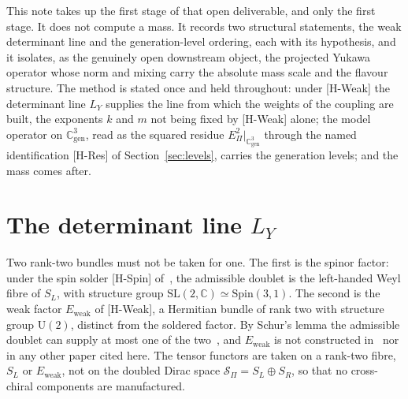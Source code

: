 \documentclass[11pt]{article}
\theoremstyle{definition}
\theoremstyle{remark}
\newcommand{\Cgen}{\mathbb{C}^{3}_{\mathrm{gen}}}
\newcommand{\Epi}{E_{\Pi}}
\newcommand{\Sbundle}{\mathcal{S}_{\Pi}}
\newcommand{\SW}{S_{L}}
\newcommand{\Ew}{E_{\mathrm{weak}}}
\newcommand{\LY}{L_{Y}}
\newcommand{\UU}{\mathrm{U}}
\newcommand{\SL}{\mathrm{SL}}
\newcommand{\Spin}{\mathrm{Spin}}
\begin{document}
    This note takes up the first stage of that open deliverable, and only the first stage.
    It does not compute a mass.
    It records two structural statements, the weak determinant line and the generation-level ordering, each with its
    hypothesis, and it isolates, as the genuinely open downstream object, the projected Yukawa operator whose norm and
    mixing carry the absolute mass scale and the flavour structure.
    The method is stated once and held throughout: under [H-Weak] the determinant line $\LY$ supplies the line from
    which the weights of the coupling are built, the exponents $k$ and $m$ not being fixed by [H-Weak] alone; the
    model operator on $\Cgen$, read as the
    squared residue $\Epi^{2}|_{\Cgen}$ through the named identification [H-Res] of Section~\ref{sec:levels}, carries
    the generation levels; and the mass comes after.

  \section{The determinant line \texorpdfstring{$\LY$}{L\_Y}}
    \label{sec:line}

    Two rank-two bundles must not be taken for one.
    The first is the spinor factor: under the spin solder [H-Spin] of~\cite{Beau2026q14}, the admissible doublet is the
    left-handed Weyl fibre of $\SW$, with structure group $\SL(2,\mathbb{C}) \simeq \Spin(3,1)$.
    The second is the weak factor $\Ew$ of [H-Weak], a Hermitian bundle of rank two with structure group $\UU(2)$,
    distinct
    from the soldered factor.
    By Schur's lemma the admissible doublet can supply at most one of the two~\cite{Beau2026q14}, and $\Ew$ is not
    constructed in~\cite{Beau2026q14} nor in any other paper cited here.
    The tensor functors are taken on a rank-two fibre, $\SW$ or $\Ew$, not on the doubled Dirac space
    $\Sbundle = S_{L} \oplus S_{R}$, so that no cross-chiral components are manufactured.
\end{document}
